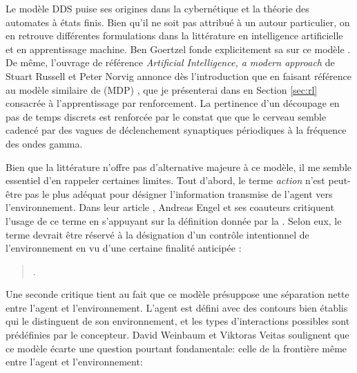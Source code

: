 Le modèle DDS puise ses origines dans la cybernétique et la théorie des automates à états finis.
Bien qu'il ne soit pas attribué à un autour particulier, on en retrouve différentes formulations dans la littérature en intelligence artificielle et en apprentissage machine. 
Ben Goertzel fonde explicitement sa  sur ce modèle \cite{goertzel_general_2021}. 
De même, l'ouvrage de référence \textit{Artificial Intelligence, a modern approach} de Stuart Russell et Peter Norvig annonce dès l'introduction que \og {} \fg  en faisant référence au modèle similaire de  (MDP) \cite[p.~iv]{russell_artificial_2021}, que je présenterai dans en Section \ref{sec:rl} consacrée à l'apprentissage par renforcement.
La pertinence d'un découpage en pas de temps discrets est renforcée par le constat que que le cerveau semble \og cadencé \fg par des vagues de déclenchement synaptiques périodiques à la fréquence des ondes gamma.

Bien que la littérature n'offre pas d'alternative majeure à ce modèle, il me semble essentiel d'en rappeler certaines limites.
Tout d'abord, le terme \textit{action} n'est peut-être pas le plus adéquat pour désigner l'information transmise de l'agent vers l'environnement.
Dans leur article \og {} \fg, Andreas Engel et ses coauteurs critiquent l'usage de ce terme en s'appuyant sur la définition donnée par la .
Selon eux, le terme  devrait être réservé à la désignation d'un contrôle intentionnel de l'environnement en vu d'une certaine finalité anticipée :


\begin{quote}
	\cite[p.~202]{engel_wheres_2013}.
\end{quote}


Une seconde critique tient au fait que ce modèle présuppose une séparation nette entre l'agent et l'environnement. 
L'agent est défini avec des contours bien établis qui le distinguent de son environnement, et les types d'interactions possibles sont prédéfinies par le concepteur. 
David Weinbaum et Viktoras Veitas soulignent que ce modèle écarte une question pourtant fondamentale: celle de la frontière même entre l'agent et l'environnement:

